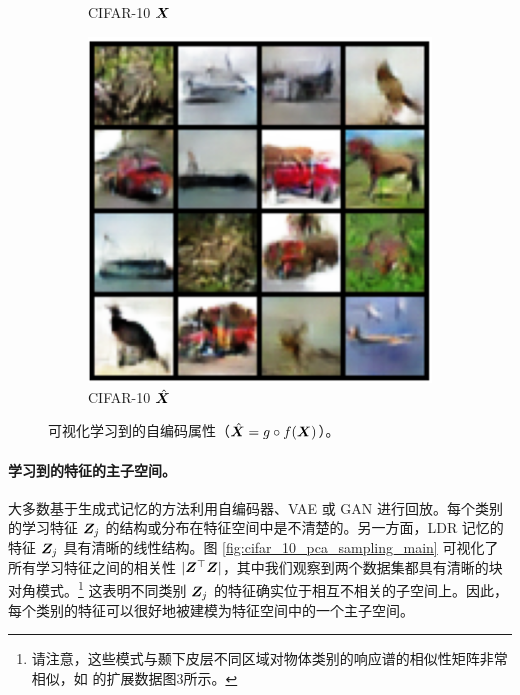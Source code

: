 \documentclass[../../book-main.tex]{subfiles}
\begin{document}
\begin{figure}[t]
\begin{subfigure}[t]{0.20\textwidth}
        \caption{CIFAR-10 $\bm{X}$}
    \end{subfigure}
    \hfill
    \begin{subfigure}[t]{0.20\textwidth}
        \centering
        \includegraphics[width=\textwidth]{figs_chap6/cifar10_x_recon.png}
        \caption{CIFAR-10 $\hat{\bm{X}}$}
    \end{subfigure}
    \caption{\small 可视化学习到的自编码属性（$\hat{\bm{X}} = g\circ f(\bm{X})$）。}
        \label{fig:justifyx=x}
\end{figure}


\paragraph{学习到的特征的主子空间。}
大多数基于生成式记忆的方法利用自编码器、VAE 或 GAN 进行回放。每个类别的学习特征 $\bm{Z}_j$ 的结构或分布在特征空间中是不清楚的。另一方面，LDR 记忆的特征 $\bm{Z}_j$ 具有清晰的线性结构。图 \ref{fig:cifar_10_pca_sampling_main} 可视化了所有学习特征之间的相关性 $|\bm{Z}^\top\bm{Z}|$，其中我们观察到两个数据集都具有清晰的块对角模式。\footnote{请注意，这些模式与颞下皮层不同区域对物体类别的响应谱的相似性矩阵非常相似，如 \cite{Bao2020AMO} 的扩展数据图3所示。} 这表明不同类别 $\bm{Z}_j$ 的特征确实位于相互不相关的子空间上。因此，每个类别的特征可以很好地被建模为特征空间中的一个主子空间。%
\end{document}
